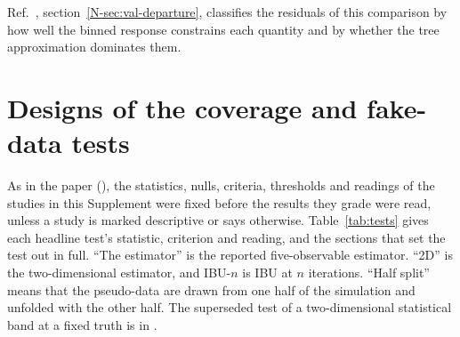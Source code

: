 Ref.~\cite{AnalysisNote2026}, section~\ref*{N-sec:val-departure}, classifies the residuals of this comparison by how well the binned response constrains each quantity and by whether the tree approximation dominates them.

\section{Designs of the coverage and fake-data tests}
\label{supp:tests}

As in the paper (), the statistics, nulls, criteria, thresholds and readings of the studies in this Supplement were fixed before the results they grade were read, unless a study is marked descriptive or says otherwise. Table~\ref{tab:tests} gives each headline test's statistic, criterion and reading, and the sections that set the test out in full. ``The estimator'' is the reported five-observable estimator. ``2D'' is the two-dimensional estimator, and IBU-$n$ is IBU at $n$ iterations. ``Half split'' means that the pseudo-data are drawn from one half of the simulation and unfolded with the other half. The superseded test of a two-dimensional statistical band at a fixed truth is in .

